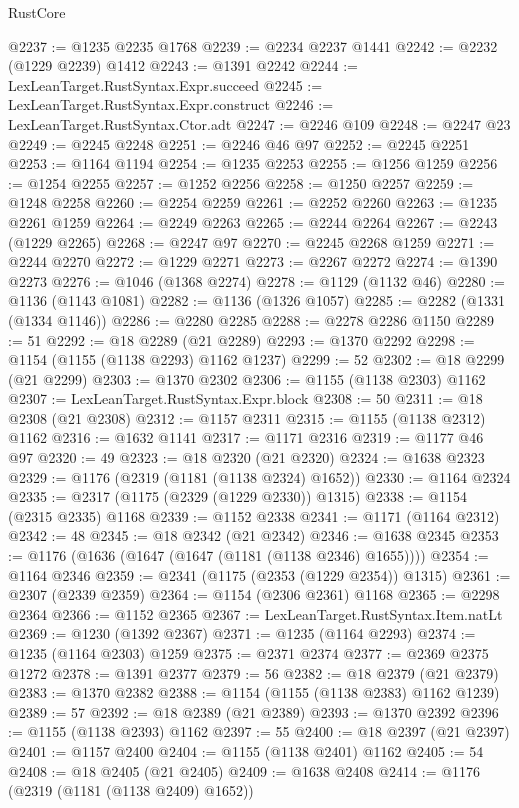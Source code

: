 \begin{lexlean}{RustCore}
\begin{coremodule}
@2237 := @1235 @2235 @1768
@2239 := @2234 @2237 @1441
@2242 := @2232 (@1229 @2239) @1412
@2243 := @1391 @2242
@2244 := LexLeanTarget.RustSyntax.Expr.succeed
@2245 := LexLeanTarget.RustSyntax.Expr.construct
@2246 := LexLeanTarget.RustSyntax.Ctor.adt
@2247 := @2246 @109
@2248 := @2247 @23
@2249 := @2245 @2248
@2251 := @2246 @46 @97
@2252 := @2245 @2251
@2253 := @1164 @1194
@2254 := @1235 @2253
@2255 := @1256 @1259
@2256 := @1254 @2255
@2257 := @1252 @2256
@2258 := @1250 @2257
@2259 := @1248 @2258
@2260 := @2254 @2259
@2261 := @2252 @2260
@2263 := @1235 @2261 @1259
@2264 := @2249 @2263
@2265 := @2244 @2264
@2267 := @2243 (@1229 @2265)
@2268 := @2247 @97
@2270 := @2245 @2268 @1259
@2271 := @2244 @2270
@2272 := @1229 @2271
@2273 := @2267 @2272
@2274 := @1390 @2273
@2276 := @1046 (@1368 @2274)
@2278 := @1129 (@1132 @46)
@2280 := @1136 (@1143 @1081)
@2282 := @1136 (@1326 @1057)
@2285 := @2282 (@1331 (@1334 @1146))
@2286 := @2280 @2285
@2288 := @2278 @2286 @1150
@2289 := 51
@2292 := @18 @2289 (@21 @2289)
@2293 := @1370 @2292
@2298 := @1154 (@1155 (@1138 @2293) @1162 @1237)
@2299 := 52
@2302 := @18 @2299 (@21 @2299)
@2303 := @1370 @2302
@2306 := @1155 (@1138 @2303) @1162
@2307 := LexLeanTarget.RustSyntax.Expr.block
@2308 := 50
@2311 := @18 @2308 (@21 @2308)
@2312 := @1157 @2311
@2315 := @1155 (@1138 @2312) @1162
@2316 := @1632 @1141
@2317 := @1171 @2316
@2319 := @1177 @46 @97
@2320 := 49
@2323 := @18 @2320 (@21 @2320)
@2324 := @1638 @2323
@2329 := @1176 (@2319 (@1181 (@1138 @2324) @1652))
@2330 := @1164 @2324
@2335 := @2317 (@1175 (@2329 (@1229 @2330)) @1315)
@2338 := @1154 (@2315 @2335) @1168
@2339 := @1152 @2338
@2341 := @1171 (@1164 @2312)
@2342 := 48
@2345 := @18 @2342 (@21 @2342)
@2346 := @1638 @2345
@2353 := @1176 (@1636 (@1647 (@1647 (@1181 (@1138 @2346) @1655))))
@2354 := @1164 @2346
@2359 := @2341 (@1175 (@2353 (@1229 @2354)) @1315)
@2361 := @2307 (@2339 @2359)
@2364 := @1154 (@2306 @2361) @1168
@2365 := @2298 @2364
@2366 := @1152 @2365
@2367 := LexLeanTarget.RustSyntax.Item.natLt
@2369 := @1230 (@1392 @2367)
@2371 := @1235 (@1164 @2293)
@2374 := @1235 (@1164 @2303) @1259
@2375 := @2371 @2374
@2377 := @2369 @2375 @1272
@2378 := @1391 @2377
@2379 := 56
@2382 := @18 @2379 (@21 @2379)
@2383 := @1370 @2382
@2388 := @1154 (@1155 (@1138 @2383) @1162 @1239)
@2389 := 57
@2392 := @18 @2389 (@21 @2389)
@2393 := @1370 @2392
@2396 := @1155 (@1138 @2393) @1162
@2397 := 55
@2400 := @18 @2397 (@21 @2397)
@2401 := @1157 @2400
@2404 := @1155 (@1138 @2401) @1162
@2405 := 54
@2408 := @18 @2405 (@21 @2405)
@2409 := @1638 @2408
@2414 := @1176 (@2319 (@1181 (@1138 @2409) @1652))

\end{coremodule}
\end{lexlean}
